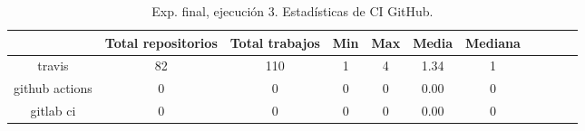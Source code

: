 \begin{table}[h]
  \centering
  \caption{Exp. final, ejecución 3. Estadísticas de CI GitHub.}
  \label{tab:tabla_f3_3}

\begin{footnotesize}
\renewcommand{\arraystretch}{1.5} %
\begin{tabular}{ccccccccccc}
  \hline
  {} &  Total repositorios &  Total trabajos &  Min &  Max &  Media &  Mediana \\
  \hline
  travis         &         82 &         110 &    1 &    4 &   1.34 &        1 \\
  github actions &          0 &           0 &    0 &    0 &   0.00 &        0 \\
  gitlab ci      &          0 &           0 &    0 &    0 &   0.00 &        0 \\
 \end{tabular}
\end{footnotesize}

\end{table}

